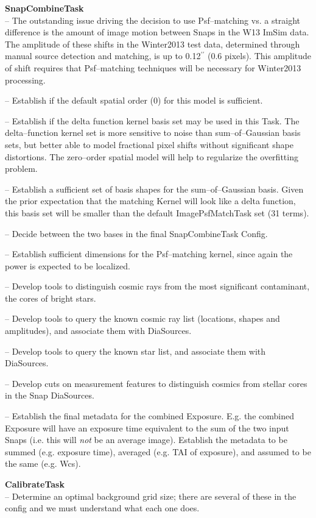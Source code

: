 \documentclass[12pt]{article}
\def\arcsec{^{\prime\prime}}
\begin{document}
{\bf SnapCombineTask}\\

-- The outstanding issue driving the decision to use Psf--matching vs. a straight difference
is the amount of image motion between Snaps in the W13 ImSim data.
The amplitude of these shifts in the Winter2013 test data, determined
through manual source detection and matching, is up to 0.12$\arcsec$
(0.6 pixels).  This amplitude of shift requires that Psf--matching techniques will be necessary for Winter2013 processing.  

-- Establish if the default spatial order (0) for this model is sufficient.

-- Establish if the delta function kernel basis set may be used in this Task.
 The delta--function kernel set is more sensitive
to noise than sum--of--Gaussian basis sets, but better able to model
fractional pixel shifts without significant shape distortions.  The
zero--order spatial model will help to regularize the overfitting
problem.

-- Establish a sufficient set of basis shapes for the sum--of--Gaussian basis.
Given the prior expectation that the matching Kernel will look like a delta function, 
this basis set will be smaller than the default ImagePsfMatchTask set (31 terms).

-- Decide between the two bases in the final SnapCombineTask Config.

-- Establish sufficient dimensions for the Psf--matching kernel, since again
the power is expected to be localized.

-- Develop tools to distinguish cosmic rays from the most significant
contaminant, the cores of bright stars.  

-- Develop tools to query the known cosmic ray list (locations, shapes and amplitudes), 
and associate them with DiaSources.

-- Develop tools to query the known star list, and associate them with DiaSources.

-- Develop cuts on measurement features to distinguish cosmics from
stellar cores in the Snap DiaSources.

-- Establish the final metadata for the combined Exposure.  E.g. the
combined Exposure will have an exposure time equivalent to the sum of
the two input Snaps (i.e. this will {\it not} be an average image).  Establish
the metadata to be summed (e.g. exposure time), averaged (e.g. TAI of exposure), 
and assumed to be the same (e.g. Wcs).

{\bf CalibrateTask}\\
-- Determine an optimal background grid size; there are several of these in the config
  and we must understand what each one does.
\end{document}

